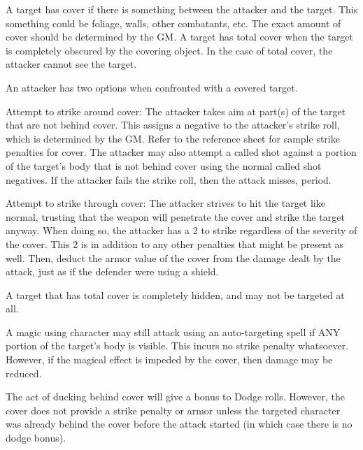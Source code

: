 \documentclass[twoside]{book}
\begin{document}
    {  
      A target has cover if there is something between
               the attacker and the target. This something could be
               foliage, walls, other combatants, etc. The exact amount of
               cover should be determined by the GM. A target has total
               cover when the target is completely obscured by the
               covering object. In the case of total cover, the attacker
               cannot see the target. 
    }
  
    {  
      An attacker has two options when confronted with a
               covered target. 
    }
  
    {  
      Attempt to strike around cover: The attacker takes
               aim at part(s) of the target that are not behind cover.
               This assigns a negative to the attacker's strike
               roll, which is determined by the GM. Refer to the
               reference sheet for sample strike penalties for cover. The
               attacker may also attempt a called shot against a portion
               of the target's body that is not behind cover using
               the normal called shot negatives. If the attacker fails
               the strike roll, then the attack misses, period. 
    }
  
    {  
      Attempt to strike through cover: The attacker
               strives to hit the target like normal, trusting that the
               weapon will penetrate the cover and strike the target
               anyway. When doing so, the attacker has a 2 to
               strike regardless of the severity of the cover. This
               2 is in addition to any other penalties that might
               be present as well. Then, deduct the armor value of the
               cover from the damage dealt by the attack, just as if the
               defender were using a shield. 
    }
  
    {  
      A target that has total cover is completely hidden,
               and may not be targeted at all. 
    }
  
    {  
      A magic using character may still attack using an
               auto-targeting spell if ANY portion of the target's
               body is visible. This incurs no strike penalty whatsoever.
               However, if the magical effect is impeded by the cover,
               then damage may be reduced. 
    }
  
    {  
      The act of ducking behind cover will give a bonus
               to Dodge rolls. However, the cover does not provide a
               strike penalty or armor unless the targeted character was
               already behind the cover before the attack started (in
               which case there is no dodge bonus). 
    }
  
\end{document}
